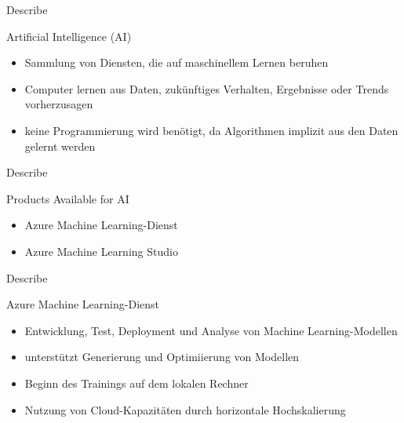 \documentclass{scrartcl}
\newenvironment{flashcard}[2][]{%
    #1
    \vfill
    \centerline{\Large{#2}}
    \vfill
\newpage
}
{\newpage}
\begin{document}
    \begin{flashcard}[Describe]{Artificial Intelligence (AI)}
        \begin{itemize}
            \item Sammlung von Diensten, die auf maschinellem Lernen beruhen
            \item Computer lernen aus Daten, zukünftiges Verhalten, Ergebnisse oder Trends vorherzusagen
            \item keine Programmierung wird benötigt, da Algorithmen implizit aus den Daten gelernt werden
        \end{itemize}

    \end{flashcard}

    \begin{flashcard}[Describe]{Products Available for AI}
        \begin{itemize}
            \item Azure Machine Learning-Dienst
            \item Azure Machine Learning Studio
        \end{itemize}

    \end{flashcard}

    \begin{flashcard}[Describe]{Azure Machine Learning-Dienst}
        \begin{itemize}
            \item Entwicklung, Test, Deployment und Analyse von Machine Learning-Modellen
            \item unterstützt Generierung und Optimiierung von Modellen
            \item Beginn des Trainings auf dem lokalen Rechner
            \item Nutzung von Cloud-Kapazitäten durch horizontale Hochskalierung
        \end{itemize}
    \end{flashcard}
\end{document}
